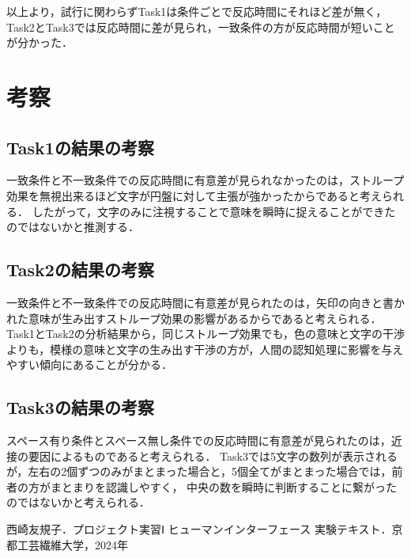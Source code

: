\documentclass{jlreq}
\numberwithin{equation}{section}
\begin{document}
以上より，試行に関わらずTask1は条件ごとで反応時間にそれほど差が無く，Task2とTask3では反応時間に差が見られ，一致条件の方が反応時間が短いことが分かった．
\clearpage

\section{考察}

\subsection{Task1の結果の考察}
一致条件と不一致条件での反応時間に有意差が見られなかったのは，ストループ効果を無視出来るほど文字が円盤に対して主張が強かったからであると考えられる．
したがって，文字のみに注視することで意味を瞬時に捉えることができたのではないかと推測する．

\subsection{Task2の結果の考察}
一致条件と不一致条件での反応時間に有意差が見られたのは，矢印の向きと書かれた意味が生み出すストループ効果の影響があるからであると考えられる．
Task1とTask2の分析結果から，同じストループ効果でも，色の意味と文字の干渉よりも，模様の意味と文字の生み出す干渉の方が，人間の認知処理に影響を与えやすい傾向にあることが分かる．

\subsection{Task3の結果の考察}
スペース有り条件とスペース無し条件での反応時間に有意差が見られたのは，近接の要因によるものであると考えられる．
Task3では5文字の数列が表示されるが，左右の2個ずつのみがまとまった場合と，5個全てがまとまった場合では，前者の方がまとまりを認識しやすく，
中央の数を瞬時に判断することに繋がったのではないかと考えられる．

\begin{thebibliography}{9}
  \item 西崎友規子．プロジェクト実習Ⅰ ヒューマンインターフェース 実験テキスト．京都工芸繊維大学，2024年
\end{thebibliography}
\end{document}
